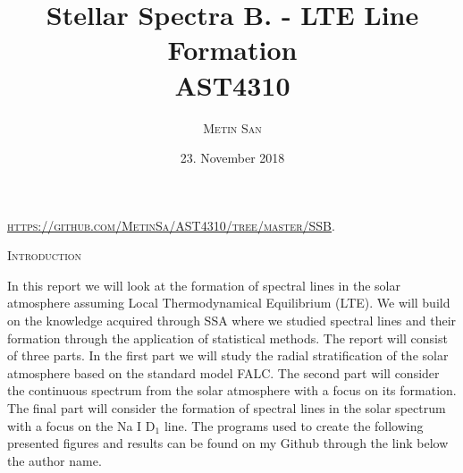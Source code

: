 \documentclass[a4paper,11.5pt,]{article}
\title{Stellar Spectra B. - LTE Line Formation\\
 AST4310}
\date{\normalsize{23. November 2018} }
\author{\textsc{\small{Metin San}}}
\begin{document}
\maketitle
\begin{center}
   \textsc{\url{https://github.com/MetinSa/AST4310/tree/master/SSB}}. 
\end{center}

\begin{center}
\textsc{Introduction}
\end{center}

\begin{adjustwidth}{1.5cm}{1.5cm}
In this report we will look at the formation of spectral lines in the solar atmosphere assuming Local Thermodynamical Equilibrium (LTE). We will build on the knowledge acquired through SSA where we studied spectral lines and their formation through the application of statistical methods. The report will consist of three parts. In the first part we will study the radial stratification of the solar atmosphere based on the standard model FALC. The second part will consider the continuous spectrum from the solar atmosphere with a focus on its formation. The final part will consider the formation of spectral lines in the solar spectrum with a focus on the Na I D$_1$ line. The programs used to create the following presented figures and results can be found on my Github through the link below the author name.
\end{adjustwidth}
\end{document}
